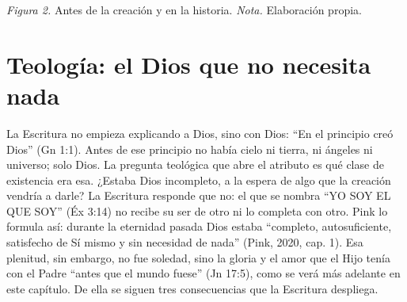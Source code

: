 \begin{center}
\par
{\footnotesize\color{gris}\textit{Figura 2.} Antes de la creación y en la historia. \textit{Nota.} Elaboración propia.}
\end{center}

\section{Teología: el Dios que no necesita nada}

La Escritura no empieza explicando a Dios, sino con Dios: ``En el principio creó Dios'' (Gn 1:1). Antes de ese principio no había cielo ni tierra, ni ángeles ni universo; solo Dios. La pregunta teológica que abre el atributo es qué clase de existencia era esa. ¿Estaba Dios incompleto, a la espera de algo que la creación vendría a darle? La Escritura responde que no: el que se nombra ``YO SOY EL QUE SOY'' (Éx 3:14) no recibe su ser de otro ni lo completa con otro. Pink lo formula así: durante la eternidad pasada Dios estaba ``completo, autosuficiente, satisfecho de Sí mismo y sin necesidad de nada'' (Pink, 2020, cap. 1). Esa plenitud, sin embargo, no fue soledad, sino la gloria y el amor que el Hijo tenía con el Padre ``antes que el mundo fuese'' (Jn 17:5), como se verá más adelante en este capítulo. De ella se siguen tres consecuencias que la Escritura despliega.

